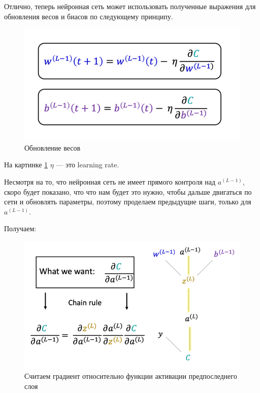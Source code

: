 \documentclass[a4paper, 10pt, openany]{book} %
\begin{document}
	Отлично, теперь нейронная сеть может использовать полученные выражения для обновления весов и биасов по следующему принципу.
	
	\begin{figure}[h!]
		\centering
		\includegraphics[width=\linewidth]{pictures/backpropagation/updating.png}
		\caption{Обновление весов}
		\label{updating}
	\end{figure}
	
	На картинке \ref{updating} $\eta$ --- это learning rate.
	
	Несмотря на то, что нейронная сеть не имеет прямого контроля над $a^{(L-1)}$, скоро будет показано, что что нам будет это нужно, чтобы дальше двигаться по сети и обновлять параметры, поэтому проделаем предыдущие шаги, только для $a^{(L-1)}$.
	
	Получаем:
	
	\begin{figure}[h!]
		\centering
		\includegraphics[width=\linewidth]{pictures/backpropagation/last_activation.png}
		\caption{Считаем градиент относительно функции активации предпоследнего слоя}
		\label{last_activation}
	\end{figure}
	
\end{document}
